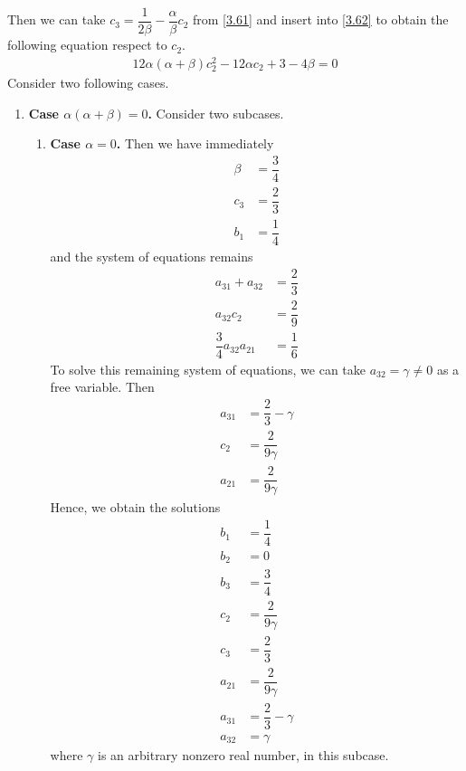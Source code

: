 \documentclass[a4paper,oneside]{book}
\numberwithin{equation}{chapter}
\begin{document}
Then we can take ${c_3} = \dfrac{1}{{2\beta }} - \dfrac{\alpha }{\beta }{c_2}$ from \eqref{3.61} and insert into \eqref{3.62} to obtain the following equation respect to $c_2$.
\begin{align}
\label{3.63}
12\alpha \left( {\alpha  + \beta } \right)c_2^2 - 12\alpha {c_2} + 3 - 4\beta  = 0
\end{align}
Consider two following cases.
\begin{enumerate}
\item \textbf{Case $\alpha \left( {\alpha  + \beta } \right)=0$.} Consider two subcases.
\begin{enumerate}
\item \textbf{Case $\alpha=0$.} Then we have immediately
\begin{align}
\beta  &= \dfrac{3}{4}\\
{c_3} &= \dfrac{2}{3}\\
b_1 &=\dfrac{1}{4}
\end{align}
and the system of equations remains
\begin{align}
{a_{31}} + {a_{32}} &= \dfrac{2}{3}\\
{a_{32}}{c_2} &= \dfrac{2}{9}\\
\dfrac{3}{4}{a_{32}}{a_{21}} &= \dfrac{1}{6}
\end{align}
To solve this remaining system of equations, we can take $a_{32}=\gamma \ne 0$ as a free variable. Then
\begin{align}
{a_{31}} &= \dfrac{2}{3} - \gamma \\
{c_2} &= \dfrac{2}{{9\gamma }}\\
{a_{21}} &=\dfrac{2}{{9\gamma }}
\end{align}
Hence, we obtain the solutions
\begin{align}
{b_1} &= \dfrac{1}{4}\\
{b_2} &= 0\\
{b_3} &= \dfrac{3}{4}\\
{c_2} &= \dfrac{2}{{9\gamma }}\\
{c_3} &= \dfrac{2}{3}\\
{a_{21}} &= \dfrac{2}{{9\gamma }}\\
{a_{31}} &= \dfrac{2}{3} - \gamma \\
{a_{32}} &= \gamma 
\end{align}
where $\gamma$ is an arbitrary nonzero real number, in this subcase.


\end{enumerate}
\end{enumerate}
\end{document}
